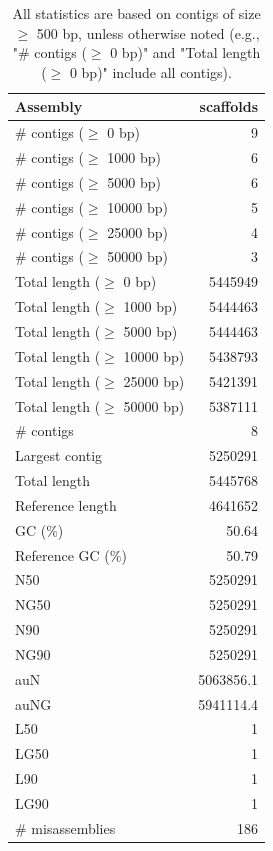 \documentclass[12pt,a4paper]{article}
\begin{document}
\begin{table}[ht]
\begin{center}
\caption{All statistics are based on contigs of size $\geq$ 500 bp, unless otherwise noted (e.g., "\# contigs ($\geq$ 0 bp)" and "Total length ($\geq$ 0 bp)" include all contigs).}
\begin{tabular}{|l*{1}{|r}|}
\hline
Assembly & scaffolds \\ \hline
\# contigs ($\geq$ 0 bp) & 9 \\ \hline
\# contigs ($\geq$ 1000 bp) & 6 \\ \hline
\# contigs ($\geq$ 5000 bp) & 6 \\ \hline
\# contigs ($\geq$ 10000 bp) & 5 \\ \hline
\# contigs ($\geq$ 25000 bp) & 4 \\ \hline
\# contigs ($\geq$ 50000 bp) & 3 \\ \hline
Total length ($\geq$ 0 bp) & 5445949 \\ \hline
Total length ($\geq$ 1000 bp) & 5444463 \\ \hline
Total length ($\geq$ 5000 bp) & 5444463 \\ \hline
Total length ($\geq$ 10000 bp) & 5438793 \\ \hline
Total length ($\geq$ 25000 bp) & 5421391 \\ \hline
Total length ($\geq$ 50000 bp) & 5387111 \\ \hline
\# contigs & 8 \\ \hline
Largest contig & 5250291 \\ \hline
Total length & 5445768 \\ \hline
Reference length & 4641652 \\ \hline
GC (\%) & 50.64 \\ \hline
Reference GC (\%) & 50.79 \\ \hline
N50 & 5250291 \\ \hline
NG50 & 5250291 \\ \hline
N90 & 5250291 \\ \hline
NG90 & 5250291 \\ \hline
auN & 5063856.1 \\ \hline
auNG & 5941114.4 \\ \hline
L50 & 1 \\ \hline
LG50 & 1 \\ \hline
L90 & 1 \\ \hline
LG90 & 1 \\ \hline
\# misassemblies & 186 \\ \hline

\end{tabular}
\end{center}
\end{table}
\end{document}

